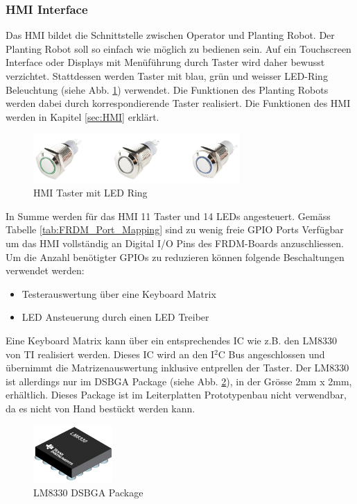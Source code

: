 \subsubsection{HMI Interface} \label{sec:Mainboard_HMI_Interface}
Das HMI bildet die Schnittstelle zwischen Operator und Planting Robot. Der Planting Robot soll so einfach wie möglich zu bedienen sein. Auf ein Touchscreen Interface oder Displays mit Menüführung durch Taster wird daher bewusst verzichtet. Stattdessen werden Taster mit blau, grün und weisser LED-Ring Beleuchtung (siehe Abb. \ref{fig:Taster_LED-Ring}) verwendet. Die Funktionen des Planting Robots werden dabei durch korrespondierende Taster realisiert. Die Funktionen des HMI werden in Kapitel \ref{sec:HMI} erklärt.
\begin{figure}[H]
	\includegraphics[width=0.7\textwidth]{Illustrationen/6-Umsetzung/HMI_LED_Taster.png}
	\caption{HMI Taster mit LED Ring \protect\cite{HMI_Taster}}
	\label{fig:Taster_LED-Ring}
\end{figure}

In Summe werden für das HMI 11 Taster und 14 LEDs angesteuert. Gemäss Tabelle \ref{tab:FRDM_Port_Mapping} sind zu wenig freie GPIO Ports Verfügbar um das HMI vollständig an Digital I/O Pins des FRDM-Boards anzuschliessen. Um die Anzahl benötigter GPIOs zu reduzieren können folgende Beschaltungen verwendet werden:
\begin{itemize}
	\item Testerauswertung über eine Keyboard Matrix
	\item LED Ansteuerung durch einen LED Treiber
\end{itemize}

Eine Keyboard Matrix kann über ein entsprechendes IC wie z.B. den LM8330 von TI realisiert werden. Dieses IC wird an den I$^2$C Bus angeschlossen und übernimmt die Matrizenauswertung inklusive entprellen der Taster. Der LM8330 ist allerdings nur im DSBGA Package (siehe Abb. \ref{fig:DSBGA_Package}), in der Grösse 2mm x 2mm, erhältlich. Dieses Package ist im Leiterplatten Prototypenbau nicht verwendbar, da es nicht von Hand bestückt werden kann.\newline

\begin{figure}[H]
	\includegraphics[width=0.27\textwidth]{Illustrationen/6-Umsetzung/DSBGA_Package.png}
	\caption{LM8330 DSBGA Package \protect\cite{DSBGA_Package}}
	\label{fig:DSBGA_Package}
\end{figure}

